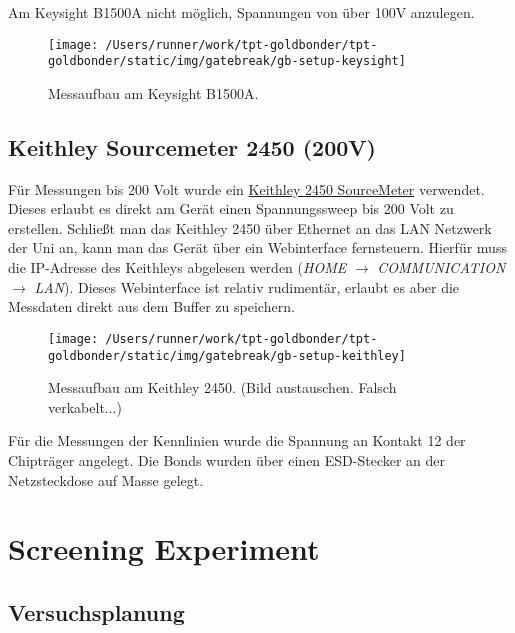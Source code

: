 \documentclass[
  paper=a4,
  ,captions=tableheading
]{scrartcl}
\begin{document}
Am Keysight B1500A nicht möglich, Spannungen von über 100V anzulegen.

\begin{figure}

{\centering \texttt{[image: /Users/runner/work/tpt-goldbonder/tpt-goldbonder/static/img/gatebreak/gb-setup-keysight]} 

}

\caption{Messaufbau am Keysight B1500A.}\label{fig:keysight-setup}
\end{figure}

\hypertarget{keithley}{%
\subsection{Keithley Sourcemeter 2450 (200V)}\label{keithley}}

Für Messungen bis 200 Volt wurde ein \href{https://www.datatec.de/keithley-2450}{Keithley 2450 SourceMeter} verwendet. Dieses erlaubt es direkt am Gerät einen Spannungssweep bis 200 Volt zu erstellen. Schließt man das Keithley 2450 über Ethernet an das LAN Netzwerk der Uni an, kann man das Gerät über ein Webinterface fernsteuern. Hierfür muss die IP-Adresse des Keithleys abgelesen werden (\emph{HOME} \(\rightarrow\) \emph{COMMUNICATION} \(\rightarrow\) \emph{LAN}). Dieses Webinterface ist relativ rudimentär, erlaubt es aber die Messdaten direkt aus dem Buffer zu speichern.

\begin{figure}

{\centering \texttt{[image: /Users/runner/work/tpt-goldbonder/tpt-goldbonder/static/img/gatebreak/gb-setup-keithley]} 

}

\caption{Messaufbau am Keithley 2450. (Bild austauschen. Falsch verkabelt...)}\label{fig:keythley-setup}
\end{figure}

Für die Messungen der Kennlinien wurde die Spannung an Kontakt 12 der Chipträger angelegt. Die Bonds wurden über einen ESD-Stecker an der Netzsteckdose auf Masse gelegt.

\hypertarget{gb-screening}{%
\section{Screening Experiment}\label{gb-screening}}

\hypertarget{gb-screening-doe}{%
\subsection{Versuchsplanung}\label{gb-screening-doe}}
\end{document}
